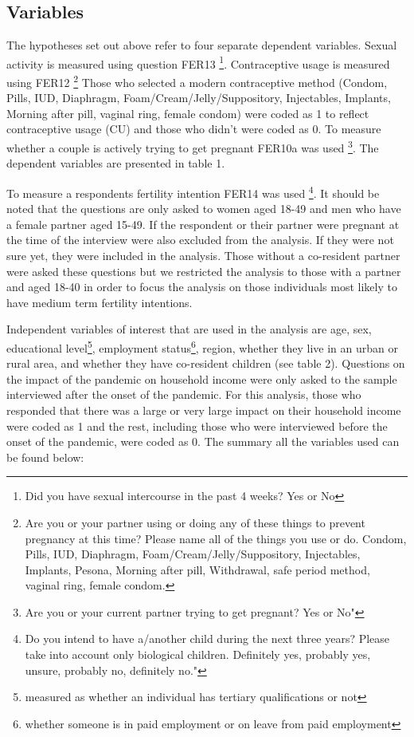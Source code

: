 \documentclass[10pt,letterpaper]{article}
\begin{document}
\subsection*{Variables}
The hypotheses set out above refer to four separate dependent variables. Sexual activity is measured using question FER13 \footnote{Did you have sexual intercourse in the past 4 weeks? Yes or No}. Contraceptive usage is measured using FER12 \footnote{Are you or your partner using or doing any of these things to prevent pregnancy at this time? Please name all of the things you use or do. Condom, Pills, IUD, Diaphragm, Foam/Cream/Jelly/Suppository, Injectables, Implants, Pesona, Morning after pill, Withdrawal, safe period method, vaginal ring, female condom.} Those who selected a modern contraceptive method (Condom, Pills, IUD, Diaphragm, Foam/Cream/Jelly/Suppository, Injectables, Implants, Morning after pill, vaginal ring, female condom) were coded as 1 to reflect contraceptive usage (CU) and those who didn't were coded as 0. To measure whether a couple is actively trying to get pregnant FER10a was used \footnote{Are you or your current partner trying to get pregnant? Yes or No"}. The dependent variables are presented in table 1.
\begin{center}

\end{center}
To measure a respondents fertility intention FER14 was used \footnote{Do you intend to have a/another child during the next three years? Please take into account only biological children. Definitely yes, probably yes, unsure, probably no, definitely no."}. It should be noted that the questions are only asked to women aged 18-49 and men who have a female partner aged 15-49. If the respondent or their partner were pregnant at the time of the interview were also excluded from the analysis. If they were not sure yet, they were included in the analysis. Those without a co-resident partner were asked these questions but we restricted the analysis to those with a partner and aged 18-40 in order to focus the analysis on those individuals most likely to have medium term fertility intentions.
\begin{center}

\end{center}
Independent variables of interest that are used in the analysis are age, sex, educational level\footnote{measured as whether an individual has tertiary qualifications or not}, employment status\footnote{whether someone is in paid employment or on leave from paid employment}, region, whether they live in an urban or rural area, and whether they have co-resident children (see table 2). Questions on the impact of the pandemic on household income were only asked to the sample interviewed after the onset of the pandemic. For this analysis, those who responded that there was a large or very large impact on their household income were coded as 1 and the rest, including those who were interviewed before the onset of the pandemic, were coded as 0. The summary all the variables used can be found below:
\end{document}

